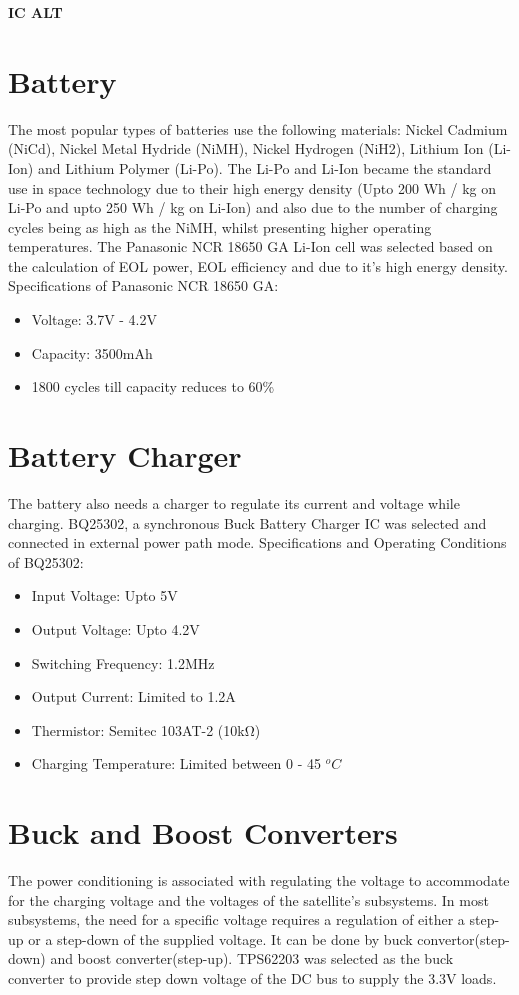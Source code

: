 {\Huge \bf IC ALT}
\section[Battery]{Battery}
The most popular types of batteries use the following materials: Nickel Cadmium
(NiCd), Nickel Metal Hydride (NiMH), Nickel Hydrogen (NiH2), Lithium Ion
(Li-Ion) and Lithium Polymer (Li-Po). The Li-Po and Li-Ion became the standard use in space technology due to their
high energy density (Upto 200 Wh / kg on Li-Po and upto 250 Wh / kg on Li-Ion) and also due to
the number of charging cycles being as high as the NiMH, whilst presenting higher
operating temperatures. 
The Panasonic NCR 18650 GA Li-Ion cell was selected based on the calculation of EOL power, EOL efficiency and due to it's high energy density.
Specifications of Panasonic NCR 18650 GA:
\begin{itemize}
	\item Voltage: 3.7V - 4.2V
	\item Capacity: 3500mAh
	\item 1800 cycles till capacity reduces to 60\%
\end{itemize}
\section[Battery Charger]{Battery Charger}
 The battery also needs a charger to regulate its current and voltage while charging.
 BQ25302, a synchronous Buck Battery Charger IC was selected and connected in external power path mode.
 Specifications and Operating Conditions of BQ25302:
 \begin{itemize}
 	\item Input Voltage: Upto 5V
 	\item Output Voltage: Upto 4.2V
 	\item Switching Frequency: 1.2MHz
 	\item Output Current: Limited to 1.2A
 	\item Thermistor: Semitec 103AT-2 (10\si{\kilo\ohm})
 	\item Charging Temperature: Limited between 0 - 45 $^{o}C$
 \end{itemize}

\section[BUBO]{Buck and Boost Converters}
The power conditioning is associated with regulating the voltage to accommodate
for the charging voltage and the voltages of the satellite's subsystems. In most
subsystems, the need for a specific voltage requires a regulation of either a step-up
or a step-down of the supplied voltage. It can be done by buck
convertor(step-down) and boost converter(step-up).
TPS62203 was selected as the buck converter to provide step down voltage of the DC bus to supply the 3.3V loads.\\

